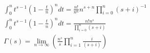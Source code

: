 	$$
	\begin{gathered}
		\int_0^n t^{s-1}\left(1-\frac{t}{n}\right)^n d t=\frac{n !}{n^n} n^{s+n} \prod_{i=0}^n(s+i)^{-1} \\
		\int_0^n t^{s-1}\left(1-\frac{t}{n}\right)^n d t=\frac{n ! n^s}{\prod_{i=0}^n(s+i)} \\
		\Gamma(s)=\lim _{n \rightarrow \infty}\left(\frac{n^s}{s} \prod_{i=1}^n \frac{i}{(s+i)}\right)
	\end{gathered}
	$$


